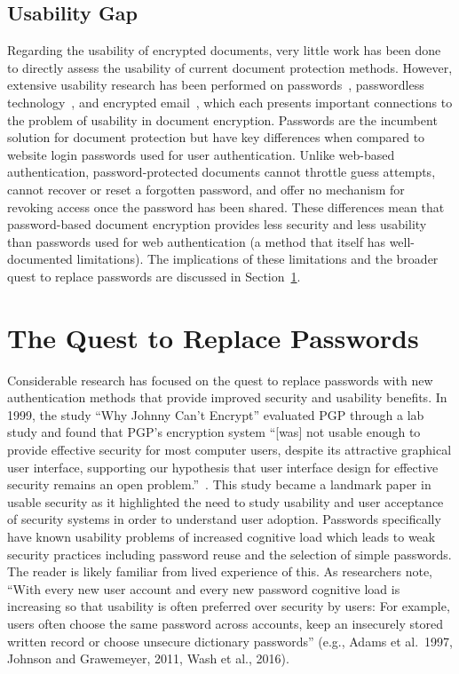 \subsection{Usability Gap}
\label{sec:usability-gap}

Regarding the usability of encrypted documents, very little work has been done to directly assess the usability of current document protection methods. However, extensive usability research has been performed on passwords~\cite{bonneau_quest_2012}, passwordless technology~\cite{alaca_comparative_2021-1}, and encrypted email~\cite{borisov_sok_2021}, which each presents important connections to the problem of usability in document encryption. Passwords are the incumbent solution for document protection but have key differences when compared to website login passwords used for user authentication. Unlike web-based authentication, password-protected documents cannot throttle guess attempts, cannot recover or reset a forgotten password, and offer no mechanism for revoking access once the password has been shared. These differences mean that password-based document encryption provides less security and less usability than passwords used for web authentication (a method that itself has well-documented limitations). The implications of these limitations and the broader quest to replace passwords are discussed in Section~\ref{sec:quest-passwords}.

\section{The Quest to Replace Passwords}
\label{sec:quest-passwords}

Considerable research has focused on the quest to replace passwords with new authentication methods that provide improved security and usability benefits. In 1999, the study ``Why Johnny Can't Encrypt'' evaluated PGP through a lab study and found that PGP's encryption system ``[was] not usable enough to provide effective security for most computer users, despite its attractive graphical user interface, supporting our hypothesis that user interface design for effective security remains an open problem.''~\cite{whitten_why_1999}. This study became a landmark paper in usable security as it highlighted the need to study usability and user acceptance of security systems in order to understand user adoption. Passwords specifically have known usability problems of increased cognitive load which leads to weak security practices including password reuse and the selection of simple passwords. The reader is likely familiar from lived experience of this. As researchers note, ``With every new user account and every new password cognitive load is increasing so that usability is often preferred over security by users: For example, users often choose the same password across accounts, keep an insecurely stored written record or choose unsecure dictionary passwords'' (e.g., Adams et al.\ 1997, Johnson and Grawemeyer, 2011, Wash et al., 2016).

